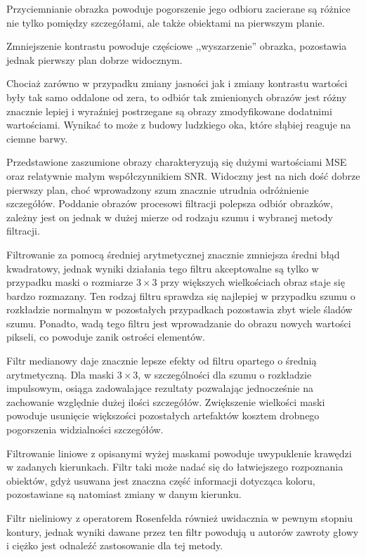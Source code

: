 \documentclass{classrep}
\begin{document}
Przyciemnianie obrazka powoduje pogorszenie jego odbioru \ppauza zacierane są różnice nie tylko pomiędzy szczegółami, ale także obiektami na pierwszym planie. 

Zmniejszenie kontrastu powoduje częściowe ,,wyszarzenie'' obrazka, pozostawia jednak pierwszy plan dobrze widocznym.

Chociaż zarówno w przypadku zmiany jasności jak i zmiany kontrastu wartości były tak samo oddalone od zera, to odbiór tak zmienionych obrazów jest różny \ppauza znacznie lepiej i wyraźniej postrzegane są obrazy zmodyfikowane dodatnimi wartościami. Wynikać to może z budowy ludzkiego oka, które słąbiej reaguje na ciemne barwy.

Przedstawione zaszumione obrazy charakteryzują się dużymi wartościami MSE oraz relatywnie małym współczynnikiem SNR. Widoczny jest na nich dość dobrze pierwszy plan, choć wprowadzony szum znacznie utrudnia odróżnienie szczegółów. Poddanie obrazów procesowi filtracji polepsza odbiór obrazków, zależny jest on jednak w dużej mierze od rodzaju szumu i wybranej metody filtracji.

Filtrowanie za pomocą średniej arytmetycznej znacznie zmniejsza średni błąd kwadratowy, jednak wyniki działania tego filtru akceptowalne są tylko w przypadku maski o rozmiarze $3 \times 3$ \ppauza przy większych wielkościach obraz staje się bardzo rozmazany. Ten rodzaj filtru sprawdza się najlepiej w przypadku szumu o rozkładzie normalnym \ppauza w pozostałych przypadkach pozostawia zbyt wiele śladów szumu. Ponadto, wadą tego filtru jest wprowadzanie do obrazu nowych wartości pikseli, co powoduje zanik ostrości elementów.

Filtr medianowy daje znacznie lepsze efekty od filtru opartego o średnią arytmetyczną. Dla maski $3 \times 3$, w szczególności dla szumu o rozkładzie impulsowym, osiąga zadowalające rezultaty pozwalając jednocześnie na zachowanie względnie dużej ilości szczegółów. Zwiększenie wielkości maski powoduje usunięcie większości pozostałych artefaktów kosztem drobnego pogorszenia widzialności szczegółów.

Filtrowanie liniowe z opisanymi wyżej maskami powoduje uwypuklenie krawędzi w zadanych kierunkach. Filtr taki może nadać się do łatwiejszego rozpoznania obiektów, gdyż usuwana jest znaczna część informacji dotycząca koloru, pozostawiane są natomiast zmiany w danym kierunku.

Filtr nieliniowy z operatorem Rosenfelda również uwidacznia \ppauza w pewnym stopniu \ppauza kontury, jednak wyniki dawane przez ten filtr powodują u autorów zawroty głowy i ciężko jest odnaleźć zastosowanie dla tej metody.

\begin{thebibliography}{99}
\end{thebibliography}
\end{document}
